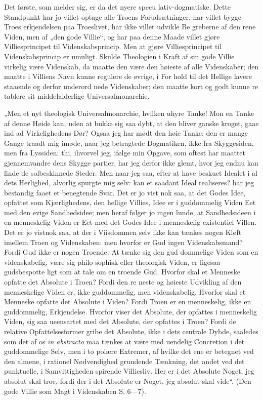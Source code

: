 \documentclass[12pt]{book}
\newcommand{\opage}[1]{\marginnote{\footnotesize\textit{[#1]}}}
\begin{document}
Det første, som melder sig, er da det nyere specu\-%
lativ-dogmatiske. Dette Standpunkt har jo villet optage
alle Troens Forudsætninger, har villet bygge Troes\-%
erkjendelsen paa Troeslivet, har ikke villet udvikle Be\-%
greberne af den rene Viden, men af „den gode Villie“,
og har paa denne Maade villet gjøre Villiesprincipet til
Videnskabsprincip. Men at gjøre Villiesprincipet til
Videnskabsprincip er umuligt. Skulde Theologien i
Kraft af sin gode Villie virkelig være Videnskab, da
maatte den være den høieste af alle Videnskaber; den
maatte i Villiens Navn kunne regulere de øvrige, i For\-%
hold til det Hellige lavere staaende og derfor underord\-%
\opage{237}\setcounter{footnote}{0}%
nede Videnskaber; den maatte kort og godt kunne re\-%
tablere sit middelalderlige Universalmonarchie.

„Men et nyt theologisk Universalmonarchie, hvilken
uhyre Tanke! Mon en Tanke af denne Høide kan, uden
at bukke sig saa dybt, at den bliver ganske kroget, gaae
ind ad Virkelighedens Dør? Ogsaa jeg har mødt den
høie Tanke; den er mange Gange traadt mig imøde,
naar jeg betragtede Dogmatiken, ikke fra Skyggesiden,
men fra Lyssiden; thi, ihvorvel jeg, ifølge min Opgave,
som oftest har maattet gjennemvandre dens Skygge\-%
partier, har jeg derfor ikke glemt, hvor jeg endnu kan
finde de solbeskinnede Steder. Men naar jeg saa, efter
at have beskuet Idealet i al dets Herlighed, alvorlig
spurgte mig selv: kan et saadant Ideal realiseres? har
jeg bestandig faaet et benegtende Svar. Det er jo vist\-%
nok saa, at det Godes Idee, opfattet som Kjærlighedens,
den hellige Villies, Idee er i guddommelig Viden Eet
med den evige Sandhedsidee; men heraf følger jo ingen\-%
lunde, at Sandhedsideen i en menneskelig Viden er Eet
med det Godes Idee i menneskelig existentiel Villen.
Det er jo vistnok saa, at der i Viisdommen selv ikke
kan tænkes nogen Kløft imellem Troen og Videnskaben:
men hvorfor er Gud ingen Videnskabsmand? Fordi
Gud ikke er nogen Troende. At tænke sig den gud\-%
dommelige Viden som en videnskabelig, være sig philo\-%
sophisk eller theologisk Viden, er ligesaa gudsbespotte\-%
ligt som at tale om en troende Gud. Hvorfor skal et
Menneske opfatte det Absolute i Troen? Fordi den re\-%
neste og høieste Udvikling af den menneskelige Viden
er, ikke guddommelig, men videnskabelig. Hvorfor skal
et Menneske opfatte det Absolute i Viden? Fordi Troen
er en menneskelig, ikke en guddommelig, Erkjendelse.
Hvorfor viser det Absolute, der opfattes i menneskelig
Viden, sig saa ueensartet med det Absolute, der opfattes
\opage{238}\setcounter{footnote}{0}%
i Troen? Fordi de relative Opfattelsesformer gribe det
Absolute, ikke i dets centrale Dybde, saaledes som det
af os \textit{in abstracto} maa tænkes at være med uendelig
Concretion i det guddommelige Selv, men i to polære
Extremer, af hvilke det ene er betegnet ved den almene,
i rationel Nødvendighed grundende Tænkning, det andet
ved det punktuelle, i Samvittigheden spirende Villiesliv.
Her er i det Absolute Noget, jeg absolut skal troe, fordi
der i det Absolute er Noget, jeg absolut skal vide“. (Den
gode Villie som Magt i Videnskaben S. 6---7).
\end{document}
